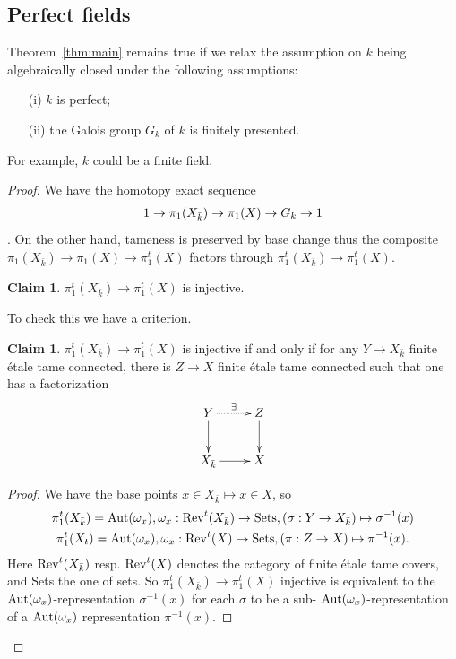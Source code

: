 \documentclass[12pt]{amsart}
\theoremstyle{plain}
\theoremstyle{definition}
\newtheorem{claim}[thm]{Claim}
\numberwithin{thm}{section}
\newcommand{\ga}[2]{\begin{gather}\label{#1}#2 \end{gather}}
\numberwithin{equation}{section}
\begin{document}
\subsection{Perfect fields} Theorem~\ref{thm:main}  remains true if we relax the assumption on $k$ being algebraically closed under the following assumptions:
\begin{itemize}
\item[(i)] $k$ is perfect;
\item[(ii)] the Galois group $G_k$ of $k$ is finitely presented. 

\end{itemize}
For example, $k$ could be a finite field. 
\begin{proof}
We have the homotopy exact sequence 
\ga{}{1\to \pi_1(X_{\bar k})\to \pi_1(X)\to G_k\to 1\notag}
\cite[Th\'eor\`eme~9.6.1]{SGA1}. On the other hand, tameness is preserved by base change thus the composite  $\pi_1(X_{\bar k}) \to \pi_1(X)\to \pi_1^t(X)$ factors through $\pi_1^t(X_{\bar k}) \to \pi_1^t(X)$. 
\begin{claim} \label{claim:left}
$\pi_1^t(X_{\bar k}) \to \pi_1^t(X)$ is injective. 

\end{claim}
To check this we have  a criterion. 
\begin{claim} \label{claim:crit}
$\pi_1^t(X_{\bar k})\to \pi_1^t(X)$  is injective if and only if for any $ Y \to X_{\bar k}$ finite \'etale tame connected, there is $Z \to X$ finite \'etale tame connected such that one has a factorization
\ga{}{\xymatrix{\ar[d] Y \ar@{.>}[r]^{\exists } & Z \ar[d]\\
X_{\bar k} \ar[r] & X
} \notag}
\end{claim} 
\begin{proof} We have the base points $x\in X_{\bar k} \mapsto x\in X$, so 
\ga{}{ \pi_1^t(X_{\bar k})={\rm Aut}(\omega_x), \omega_x: {\rm Rev}^t(X_{\bar k}) \to {\rm Sets}, (\sigma: Y\to X_{\bar k})\mapsto   \sigma^{-1}(x) \notag \\
\pi_1^t(X_t)={\rm Aut}(\omega_x), \omega_x: {\rm Rev}^t(X)\to {\rm Sets}, (\pi: Z\to X)\mapsto   \pi^{-1}(x).\notag}
Here ${\rm Rev}^t(X_{\bar k}) $ resp. ${\rm Rev}^t(X) $ denotes the category of finite \'etale  tame covers, and Sets the one of sets.
 So $\pi_1^t(X_{\bar k})\to \pi_1^t(X)$ injective is equivalent to the  ${\rm Aut}(\omega_x)$-representation $\sigma^{-1}(x)$ for each $\sigma$ to be a sub- ${\rm Aut}(\omega_x)$-representation  of a 
${\rm Aut}(\omega_x)$ representation $\pi^{-1}(x)$.



\end{proof}
\end{proof}
\end{document}
